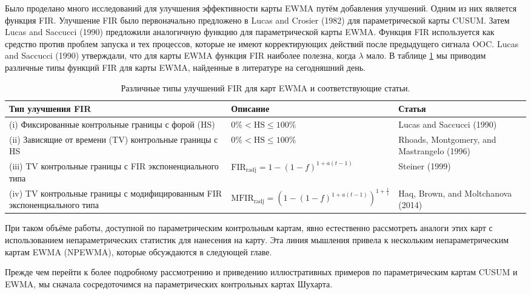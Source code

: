 Было проделано много исследований для улучшения эффективности карты EWMA путём добавления улучшений. Одним из них является функция FIR. Улучшение FIR было первоначально предложено в Lucas and Crosier (1982) для параметрической карты CUSUM. Затем Lucas and Saccucci (1990) предложили аналогичную функцию для параметрической карты EWMA. Функция FIR используется как средство против проблем запуска и тех процессов, которые не имеют корректирующих действий после предыдущего сигнала OOC. Lucas and Saccucci (1990) утверждали, что для карты EWMA функция FIR наиболее полезна, когда \(\lambda\) мало. В таблице \ref{tab:3.3} мы приводим различные типы функций FIR для карты EWMA, найденные в литературе на сегодняшний день.

\begin{table}[htbp]
	\centering
	\caption{Различные типы улучшений FIR для карт EWMA и соответствующие статьи.}
	\label{tab:3.3}
	\renewcommand{\arraystretch}{1.2}
	\begin{tabular}{p{4.5cm}p{5.5cm}p{3.5cm}}
		\toprule
		Тип улучшения FIR & Описание & Статья \\
		\midrule
		(i) Фиксированные контрольные границы с форой (HS) & \(0\% < \text{HS} \leq 100\%\) & Lucas and Saccucci (1990) \\
		(ii) Зависящие от времени (TV) контрольные границы с HS & \(0\% < \text{HS} \leq 100\%\) & Rhoads, Montgomery, and Mastrangelo (1996) \\
		(iii) TV контрольные границы с FIR экспоненциального типа & \(\text{FIR}_{\text{radj}} = 1 - (1 - f)^{1+a(t-1)}\) & Steiner (1999) \\
		(iv) TV контрольные границы с модифицированным FIR экспоненциального типа & \(\text{MFIR}_{\text{radj}} = (1 - (1 - f)^{1+a(t-1)})^{1+\frac{1}{t}}\) & Haq, Brown, and Moltchanova (2014) \\
		\bottomrule
	\end{tabular}
\end{table}

При таком объёме работы, доступной по параметрическим контрольным картам, явно естественно рассмотреть аналоги этих карт с использованием непараметрических статистик для нанесения на карту. Эта линия мышления привела к нескольким непараметрическим картам EWMA (NPEWMA), которые обсуждаются в следующей главе.

Прежде чем перейти к более подробному рассмотрению и приведению иллюстративных примеров по параметрическим картам CUSUM и EWMA, мы сначала сосредоточимся на параметрических контрольных картах Шухарта.


